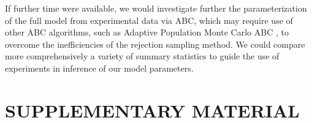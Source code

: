 \documentclass[twocolumn]{biophys}
\begin{document}
If further time were available, we would investigate further the parameterization of the full model from experimental data via ABC, which may require use of other ABC algorithms, such as Adaptive Population Monte Carlo ABC \citep{lenormand2013adaptive}, to overcome the inefficiencies of the rejection sampling method.
We could compare more comprehensively a variety of summary statistics to guide the use of experiments in inference of our model parameters.

\section*{SUPPLEMENTARY MATERIAL}


\vspace{1cm}
{}

\appendix
\end{document}
